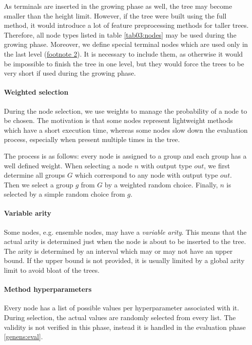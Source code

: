 As terminals are inserted in the growing phase as well, the tree may become
smaller than the height limit. However, if the tree were built using the full
method, it would introduce a lot of feature preprocessing methods for taller
trees. Therefore, all node types listed in table \ref{tab03:nodes} may be used
during the growing phase. Moreover, we define special terminal nodes which are
used only in the last level (\hyperref[tab03:nodes]{footnote 2}). It is
necessary to include them, as otherwise it would be impossible to finish the
tree in one level, but they would force the trees to be very short if used
during the growing phase.

\paragraph{Weighted selection}
During the node selection, we use weights to manage the probability of a node
to be chosen. The motivation is that some nodes represent lightweight methods
which have a short execution time, whereas some nodes slow down the evaluation
process, especially when present multiple times in the tree.

The process is as follows: every node is assigned to a group and each group has
a well defined weight. When selecting a node $n$ with output type $out$, we 
first determine all groups $G$ which correspond to any node with output type
$out$. Then we select a group $g$ from $G$ by a weighted random choice.
Finally, $n$ is selected by a simple random choice from $g$.

\paragraph{Variable arity}
Some nodes, e.g. ensemble nodes, may have a \emph{variable arity}. This means
that the actual arity is determined just when the node is about to be inserted
to the tree. The arity is determined by an interval which may or may not have
an upper bound. If the upper bound is not provided, it is usually limited by
a global arity limit to avoid bloat of the trees.

\paragraph{Method hyperparameters}
Every node has a list of possible values per hyperparameter associated with
it. During selection, the actual values are randomly selected from every list.
The validity is not verified in this phase, instead it is handled in the
evaluation phase \ref{genens:eval}.


